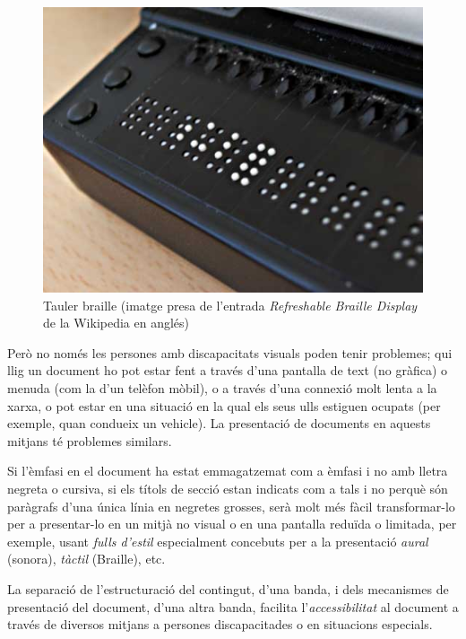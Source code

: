 \begin{figure}
  \centering
  \includegraphics[scale=0.5]{Refreshable_Braille_display.jpg}
  \caption{Tauler braille (imatge presa de l'entrada \emph{Refreshable Braille Display} de la Wikipedia en anglés)}
\end{figure}

Però no només les persones amb discapacitats visuals poden tenir
problemes; qui llig un document ho pot estar fent a través d'una
pantalla de text (no gràfica) o menuda (com la d'un telèfon mòbil), o
a través d'una connexió molt lenta a la xarxa, o pot estar en una
situació en la qual els seus ulls estiguen ocupats (per exemple, quan
condueix un vehicle). La presentació de documents en aquests mitjans
té problemes similars.

Si l'èmfasi en el document ha estat emmagatzemat com a èmfasi i no amb
lletra negreta o cursiva, si els títols de secció estan indicats com a
tals i no perquè són paràgrafs d'una única línia en negretes grosses,
serà molt més fàcil transformar-lo per a presentar-lo en un mitjà
no visual o en una pantalla reduïda o limitada, per exemple, usant
\emph{fulls d'estil} especialment concebuts per a la presentació
\emph{aural} (sonora), \emph{tàctil} (Braille), etc.

La separació de l'estructuració del contingut, d'una banda, i dels
mecanismes de presentació del document, d'una altra banda, facilita
l'\emph{accessibilitat} al document a través de diversos mitjans a
persones discapacitades o en situacions especials.



